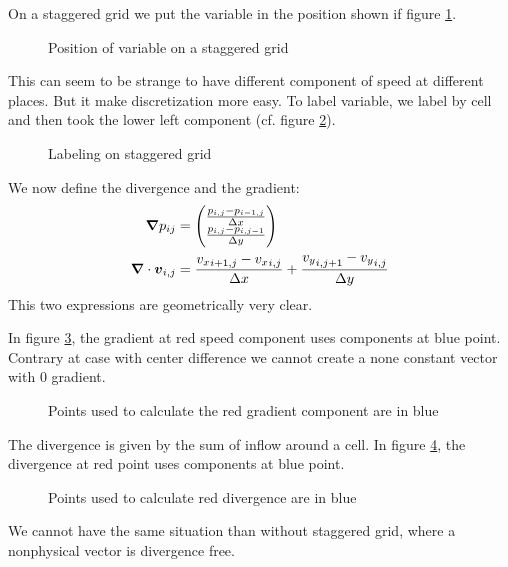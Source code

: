 On a staggered grid we put the variable in the position shown if figure \ref{fixed:staggered}.
\begin{figure}
\caption{Position of variable on a staggered grid}
\label{fixed:staggered}
\end{figure}

This can seem to be strange to have different component of speed at different places. But it make discretization more easy.
To label variable, we label by cell and then took the lower left component (cf. figure \ref{fixed:staggered_label}).
\begin{figure}
\caption{Labeling on staggered grid}
\label{fixed:staggered_label}
\end{figure}

We now define the divergence and the gradient:
\begin{align}
  {\boldsymbol {\nabla}}p_{ij}&=\begin{pmatrix}
    \frac{p_{i,j}-p_{i-1,j}}{\Delta x}\\
    \frac{p_{i,j}-p_{i,j-1}}{\Delta y}\\
                      \end{pmatrix}\\
  {\boldsymbol {\nabla}}\cdot {\boldsymbol {v}}_{i,j}&=\frac{{v_{x}}_{i+1,j}-{v_{x}}_{i,j}}{\Delta x}+\frac{{v_{y}}_{i,j+1}-{v_{y}}_{i,j}}{\Delta y}
\end{align}
This two expressions are geometrically very clear.

In figure \ref{fixed:staggered_gradient}, the gradient at red speed component uses components at blue point.
Contrary at case with center difference we cannot create a none constant vector with 0 gradient.
\begin{figure}
\caption{Points used to calculate the red gradient component are in blue}
\label{fixed:staggered_gradient}
\end{figure}

The divergence is given by the sum of inflow around a cell.
In figure \ref{fixed:staggered_divergence}, the divergence at red point uses components at blue point.
\begin{figure}
\caption{Points used to calculate red divergence are in blue}
\label{fixed:staggered_divergence}
\end{figure}

We cannot have the same situation than without staggered grid, where a nonphysical vector is divergence free.

